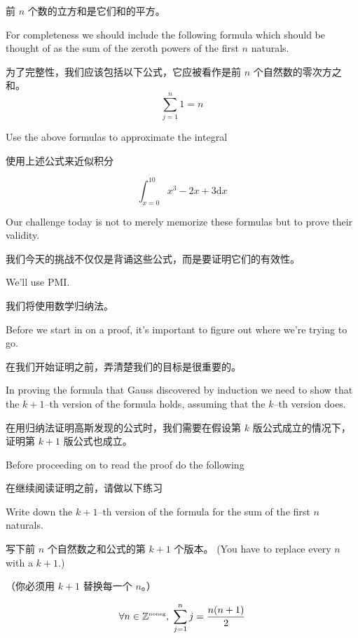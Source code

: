 \noindent 前 $n$ 个数的立方和是它们和的平方。

For completeness we should include the following formula which 
should be thought of as the sum of the zeroth powers of the first $n$
naturals.

为了完整性，我们应该包括以下公式，它应被看作是前 $n$ 个自然数的零次方之和。
\[ \sum_{j=1}^n 1 = n \]

\begin{exer}
Use the above formulas to approximate the integral

使用上述公式来近似积分

\[ \int_{x=0}^{10} x^3 - 2x +3 \mbox{d}x \]
\end{exer}
\bigskip

Our challenge today is not to merely memorize these formulas but
to prove their validity.

我们今天的挑战不仅仅是背诵这些公式，而是要证明它们的有效性。

We'll use PMI.

我们将使用数学归纳法。

Before we start in on a proof, it's important to figure out where 
we're trying to go.

在我们开始证明之前，弄清楚我们的目标是很重要的。

In proving the formula that Gauss discovered
by induction we need to show that the $k+1$--th version of the 
formula holds, assuming that the $k$--th version does.

在用归纳法证明高斯发现的公式时，我们需要在假设第 $k$ 版公式成立的情况下，证明第 $k+1$ 版公式也成立。

Before
proceeding on to read the proof do the following

在继续阅读证明之前，请做以下练习

\begin{exer}
Write down the $k+1$--th version of the formula for the sum of
the first $n$ naturals.

写下前 $n$ 个自然数之和公式的第 $k+1$ 个版本。
(You have to replace every $n$ with 
a $k+1$.)

（你必须用 $k+1$ 替换每一个 $n$。）
\end{exer}

\begin{thm}
\[ \forall n \in {\mathbb Z}^{\mbox{\tiny noneg}}, \; \sum_{j=1}^n j = \frac{n(n+1)}{2} \]
\end{thm}

